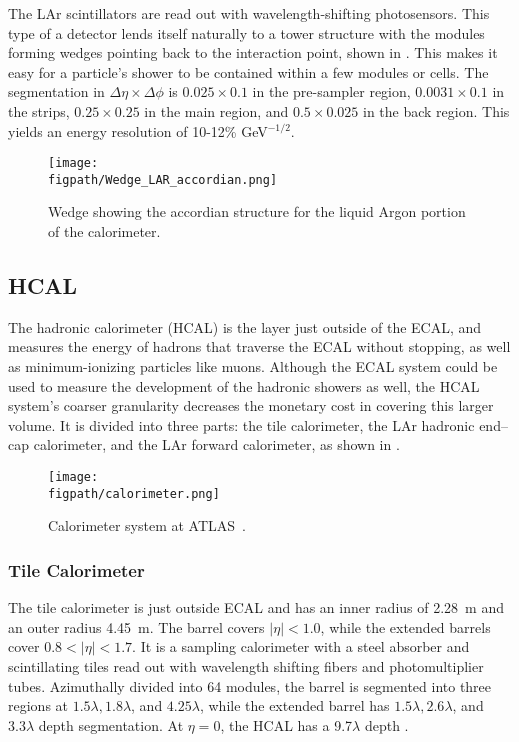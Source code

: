 The LAr scintillators are read out with wavelength-shifting photosensors.   
This type of a detector lends itself naturally to a tower structure with the modules forming wedges pointing back to the interaction point, shown in . This makes it easy for a particle's shower to be contained within a few modules or cells.  The segmentation in $\Delta \eta \times \Delta \phi$ is $0.025 \times 0.1$ in the pre-sampler region, $0.0031 \times 0.1$ in the strips, $0.25 \times 0.25$ in the main region, and $0.5 \times 0.025$ in the back region. This yields an energy resolution of 10-12\% GeV$^{-1/2}$.   

\begin{figure}[h!tbp]
\centering
\texttt{[image: \\figpath/Wedge\_LAR\_accordian.png]}
\caption{Wedge showing the accordian structure for the liquid Argon portion of the calorimeter.
~\cite{LAr}}
\label{Wedge_LAR_accordian}
\end{figure}

\subsection{HCAL}

The hadronic calorimeter (HCAL) is the layer just outside of the ECAL, and measures the 
energy of hadrons that traverse the ECAL without stopping, as well as minimum-ionizing particles like muons.
Although the ECAL system could be used to measure the development of the hadronic showers as well, the HCAL system's coarser granularity decreases the monetary cost in covering this larger volume.  It is divided into three parts: the tile calorimeter, the LAr hadronic end--cap calorimeter, and the LAr forward calorimeter, as shown in .

\begin{figure}[h!tbp]
\centering
\texttt{[image: \\figpath/calorimeter.png]}
\caption{Calorimeter system at ATLAS~\cite{ATLAS_long}.}
\label{calorimeter}
\end{figure}

\subsubsection{Tile Calorimeter}
The tile calorimeter is just outside ECAL and has an inner radius of 2.28~m and an outer radius 4.45~m.  
The barrel covers $|\eta| < 1.0$, while the extended barrels cover $0.8 < |\eta| < 1.7$.
It is a sampling calorimeter with a steel absorber and scintillating tiles read out with wavelength shifting fibers and photomultiplier tubes. 
Azimuthally divided into 64 modules, the barrel is segmented into three regions at $1.5\lambda, 1.8\lambda$, and $4.25\lambda$, while the extended barrel has $1.5\lambda, 2.6\lambda$, and $3.3\lambda$ depth segmentation.
At $\eta = 0$, the HCAL has a 9.7$\lambda$ depth \cite{ATLAS_long}.

